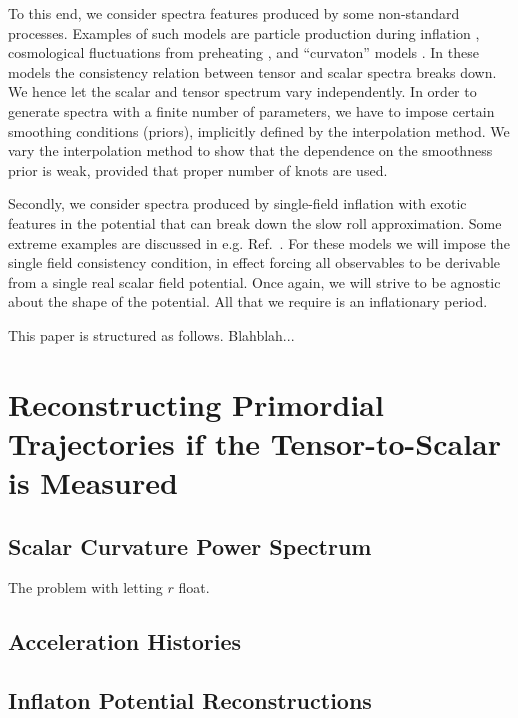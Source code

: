 \documentclass[11pt]{article}
\begin{document}
To this end, we consider spectra features produced by some non-standard processes. Examples of such models are particle production during inflation \cite{Barnaby2009a, Barnaby2009b}, cosmological fluctuations from preheating \cite{Bond2009}, and ``curvaton'' models \cite{Linde1996,Lyth2003}. In these models the consistency relation between tensor and scalar spectra breaks down. We hence let the scalar and tensor spectrum vary independently. In order to generate spectra with a finite number of parameters, we have to impose certain smoothing conditions (priors), implicitly defined by the interpolation method. We vary the interpolation method to show that the dependence on the smoothness prior is weak, provided that proper number of knots are used\footnotemark. 

Secondly, we consider spectra produced by single-field inflation with exotic features in the potential that can break down the slow roll approximation. Some extreme examples are discussed in e.g. Ref.~\cite{Starobinsky1998}. For these models we will impose the single field consistency condition, in effect forcing all observables to be derivable from a single real scalar field potential. Once again, we will strive to be agnostic about the shape of the potential. All that we require is an inflationary period. 


This paper is structured as follows. Blahblah...

\section{Reconstructing Primordial Trajectories if the Tensor-to-Scalar  is Measured}

\subsection{Scalar Curvature Power Spectrum }

The problem with letting $r$ float. 

\subsection{Acceleration Histories}

\subsection{Inflaton Potential Reconstructions}
\end{document}

